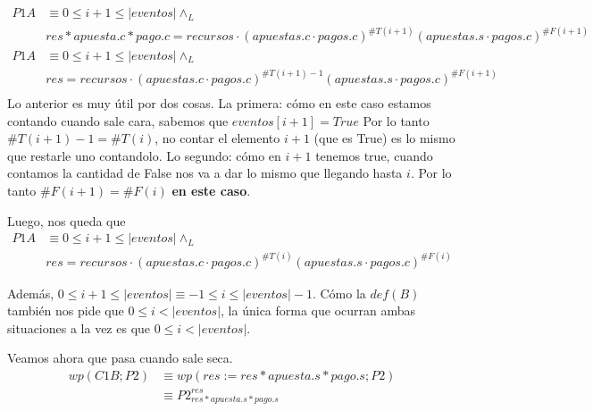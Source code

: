 \documentclass[../document.tex]{subfiles}
\begin{document}
\begin{equation*} \label{eq2.a}
\begin{split}
P1A & \equiv 0\leq i+1 \leq |eventos| \land_L \\& res * apuesta.c * pago.c = recursos \cdot (apuestas.c\cdot pagos.c)^{\#T(i+1)}(apuestas.s\cdot pagos.c)^{\#F(i+1)}\\
P1A & \equiv 0\leq i+1 \leq |eventos| \land_L \\& res = recursos \cdot (apuestas.c\cdot pagos.c)^{\#T(i+1)-1}(apuestas.s\cdot pagos.c)^{\#F(i+1)}\\
\end{split}
\end{equation*}
Lo anterior es muy útil por dos cosas.
La primera: cómo en este caso estamos contando cuando sale cara, sabemos que $eventos[i+1] = True$ Por lo tanto $\#T(i+1)-1=\#T(i)$, no contar el elemento $i+1$ (que es True) es lo mismo que restarle uno contandolo. Lo segundo: cómo en $i+1$ tenemos true, cuando contamos la cantidad de False nos va a dar lo mismo que llegando hasta $i$. Por lo tanto $\#F(i+1)=\#F(i)$ \textbf{en este caso}.

Luego, nos queda que
\begin{equation*} 
    \begin{split}
    P1A & \equiv 0\leq i+1 \leq |eventos| \land_L \\& res = recursos \cdot (apuestas.c\cdot pagos.c)^{\#T(i)}(apuestas.s\cdot pagos.c)^{\#F(i)}
    \end{split}
\end{equation*}

Además, $0\leq i+1 \leq |eventos| \equiv -1\leq i \leq |eventos|-1$. Cómo la $def(B)$ también nos pide que $0 \leq i < |eventos|$, la única forma que ocurran ambas situaciones a la vez es que $0\leq i < |eventos|$.

Veamos ahora que pasa cuando sale seca.
\begin{equation*} \label{eq2.a}
\begin{split}
wp(C1B;P2) & \equiv wp(res := res * apuesta.s * pago.s; P2) \\
           & \equiv P2^{res}_{res * apuesta.s * pago.s} \\
\end{split}
\end{equation*}
\end{document}
